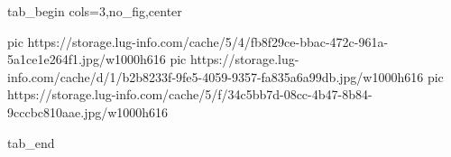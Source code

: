  
 
 
 
 


\ifcmt
  tab_begin cols=3,no_fig,center

     pic https://storage.lug-info.com/cache/5/4/fb8f29ce-bbac-472c-961a-5a1ce1e264f1.jpg/w1000h616%
		 pic https://storage.lug-info.com/cache/d/1/b2b8233f-9fe5-4059-9357-fa835a6a99db.jpg/w1000h616%
		 pic https://storage.lug-info.com/cache/5/f/34c5bb7d-08cc-4b47-8b84-9cccbc810aae.jpg/w1000h616%

  tab_end
\fi
